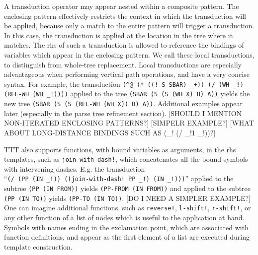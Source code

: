 \documentclass[11pt]{article}
\begin{document}
A transduction operator may appear nested within a composite pattern.  The enclosing pattern effectively restricts the context in which the transduction will be applied, because only a match to the entire pattern will trigger a transduction.   In this case, the transduction is applied at the location in the tree where it matches.  The rhs of such a transduction is allowed to reference the bindings of variables which appear in the enclosing pattern. We call these local transductions, to distinguish from whole-tree replacement.  Local transductions are especially advantageous when performing vertical path operations, and have a very concise syntax. For example,  the transduction \texttt{(\^{}@ (* ((! S SBAR) \_+)) (/ (WH \_!) (REL-WH (WH \_!))))} applied to the tree \texttt{(SBAR (S (S (WH X) B) A))} yields the new tree \texttt{(SBAR (S (S (REL-WH (WH X)) B) A))}.  Additional examples appear later (especially in the parse tree refinement section).  [SHOULD I MENTION NON-ITERATED ENCLOSING PATTERNS?] [SIMPELR EXAMPLE?] [WHAT ABOUT LONG-DISTANCE BINDINGS SUCH AS (\_! (/ \_!1 \_!))?]

TTT also supports functions, with bound variables as arguments, in the rhs templates, such as \texttt{join-with-dash!}, which concatenates all the bound symbols with intervening dashes.   E.g. the transduction \\ ``\texttt{(/ (PP (IN \_!)) ((join-with-dash! PP \_!) (IN \_!)))}'' applied to the subtree \texttt{(PP (IN FROM))} yields \texttt{(PP-FROM (IN FROM))} and applied to the subtree \texttt{(PP (IN TO))} yields \texttt{(PP-TO (IN TO))}. [DO I NEED A SIMPLER EXAMPLE?]    One can imagine additional functions, such as \texttt{reverse!}, \texttt{l-shift!}, \texttt{r-shift!}, or any other function of a list of nodes which is useful to the application at hand.   Symbols with names ending in the exclamation point, which are associated with function definitions, and appear as the first element of a list are executed during template construction. 
\end{document}
